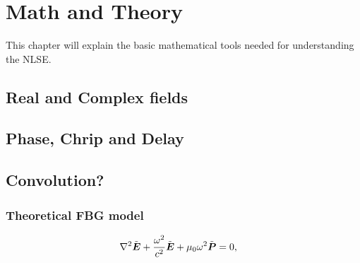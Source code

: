 \chapter{Math and Theory}
\label{ch:MathAndTheory}

This chapter will explain the basic mathematical tools needed for understanding the NLSE.


\section{Real and Complex fields}

\section{Phase, Chrip and Delay}

\section{Convolution?}

\subsection{Theoretical FBG model}

\begin{align}
    \nabla^{2}\tilde{\boldsymbol{E}}+\frac{\omega^{2}}{c^{2}}\tilde{\boldsymbol{E}}+\text{\ensuremath{\mu_{0}}}\omega^{2}\tilde{\boldsymbol{P}}&=0,
\end{align}